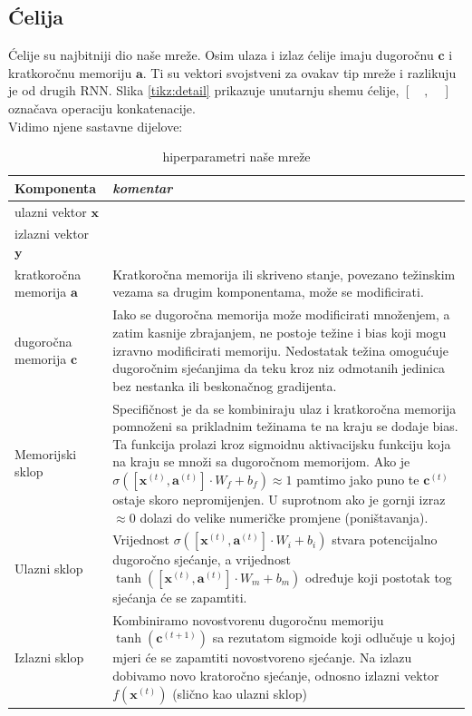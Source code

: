 \documentclass[conference]{IEEEtran}
\begin{document}
\subsection{Ćelija}
Ćelije su najbitniji dio naše mreže. Osim ulaza i izlaz ćelije imaju dugoročnu $\mathbf{c}$ i kratkoročnu memoriju $\mathbf{a}$. Ti su vektori svojstveni za ovakav tip mreže i razlikuju je od drugih RNN. Slika \ref{tikz:detail} prikazuje unutarnju shemu ćelije, $[\quad, \quad]$ označava operaciju konkatenacije.
\ \\
Vidimo njene sastavne dijelove:
\begin{table}[htbp]
\caption{hiperparametri naše mreže}
\begin{center}
\begin{tabular}{|p{80pt}|p{140pt}|}
\hline
\textbf{Komponenta} & \textbf{\textit{komentar}}\\ \hline
ulazni vektor $\mathbf{x}$ & \\ \hline
izlazni vektor $\mathbf{y}$ & \\ \hline
kratkoročna memorija $\mathbf{a}$ & Kratkoročna memorija ili skriveno stanje, povezano težinskim vezama sa drugim komponentama, može se modificirati. \\ \hline
dugoročna memorija $\mathbf{c}$ & Iako se dugoročna memorija može modificirati množenjem, a zatim kasnije zbrajanjem, ne postoje težine i bias koji mogu izravno modificirati memoriju. Nedostatak težina omogućuje dugoročnim sjećanjima da teku kroz niz odmotanih jedinica bez nestanka ili beskonačnog gradijenta. \\ \hline
Memorijski sklop & Specifičnost je da se kombiniraju ulaz i kratkoročna memorija pomnoženi sa prikladnim težinama te na kraju se dodaje bias. Ta funkcija prolazi kroz sigmoidnu aktivacijsku funkciju koja na kraju se množi sa dugoročnom memorijom. Ako je $\sigma( [\mathbf{x}^{(t)}, \mathbf{a}^{(t)}] \cdot W_f + b_f) \approx 1 $ pamtimo jako puno te $\mathbf{c}^(t)$ ostaje skoro nepromijenjen. U suprotnom ako je gornji izraz $\approx 0$ dolazi do velike numeričke promjene (poništavanja). \\ \hline
Ulazni sklop &  Vrijednost $\sigma( [\mathbf{x}^{(t)}, \mathbf{a}^{(t)}] \cdot W_i + b_i)$ stvara potencijalno dugoročno sjećanje, a vrijednost $\tanh( [\mathbf{x}^{(t)}, \mathbf{a}^{(t)}] \cdot W_m + b_m)$ određuje koji postotak tog sjećanja će se zapamtiti. \\ \hline
Izlazni sklop & Kombiniramo novostvorenu dugoročnu memoriju $\tanh(\mathbf{c}^{(t+1)})$ sa rezutatom sigmoide koji odlučuje u kojoj mjeri će se zapamtiti novostvoreno sjećanje. Na izlazu dobivamo novo kratoročno sjećanje, odnosno izlazni vektor $f(\mathbf{x}^{(t)})$ (slično kao ulazni sklop) \\ \hline
\end{tabular}
\label{tab:hiper}
\end{center}
\end{table}
\end{document}
